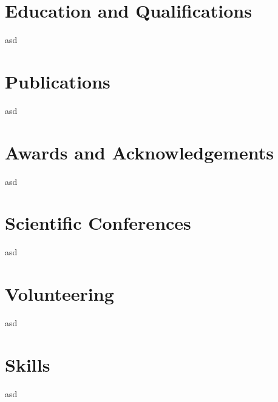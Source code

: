 \documentclass[a4paper,10pt]{article}
\begin{document}

\section{Education and Qualifications}

asd


\section{Publications}

asd


\section{Awards and Acknowledgements}

asd


\section{Scientific Conferences}

asd


\section{Volunteering}

asd


\section{Skills}

asd

\end{document}
